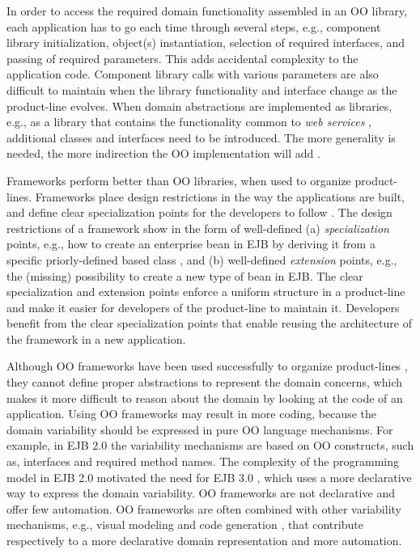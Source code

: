In order to access the required domain functionality assembled in an OO library, each application has to go each time through several steps, e.g., component library initialization, object(s) instantiation, selection of required interfaces, and passing of required parameters. This adds accidental complexity to the application code. Component library calls with various parameters are also difficult
to maintain when the library functionality and interface change as the product-line evolves. When domain abstractions are implemented as libraries, e.g., as a library that contains the functionality common to \textit{web ser\-vi\-ces} \cite{webservices.04}, additional classes and interfaces need to be introduced. The more generality is needed, the more indirection the OO implementation will add \cite{webservices.04}. %

Frameworks perform better than OO libraries, when used to organize product-lines. Frameworks place design restrictions in the way the applications are built, and define clear specialization points for the developers to follow \cite{sf.04}. The design restrictions of a framework show in the form of well-defined (a) \textit{specialization} points, e.g., how to create an enterprise bean in EJB \cite{ejb21} by deriving it from a specific priorly-defined based class , and (b) well-defined \textit{extension} points, e.g., the (missing) possibility to create a new type of bean in EJB. The clear specialization and extension points enforce a uniform structure in a product-line and make it easier for developers of the product-line to maintain it. Developers benefit from the clear specialization points that enable reusing the architecture of the framework in a new application.

Although OO frameworks have been used successfully to organize product-lines \cite{batoryetal.00}, they cannot define proper abstractions to represent the domain concerns, which makes it more difficult to reason about the domain by looking at the code of an application. Using OO frameworks may result in more coding, because the domain variability should be expressed in pure OO language mechanisms. For example, in EJB 2.0 \cite{ejb21} the variability mechanisms are based on OO constructs, such as, interfaces and required method names. The complexity of the programming model in EJB 2.0 motivated the need for EJB 3.0 \cite{ejb30}, which uses a more declarative way to express the domain variability. OO frameworks are not declarative and offer few automation. OO frameworks are often combined with other variability mechanisms, e.g., visual modeling  and code generation \cite{generative.00}, that contribute respectively to a more declarative domain representation and more automation. %

